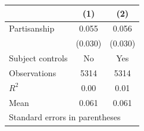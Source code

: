 \begin{tabular}{l*{2}{c}}
\hline\hline
                                   &\multicolumn{1}{c}{(1)}&\multicolumn{1}{c}{(2)}\\
\hline
Partisanship \hspace{28mm}         &    0.055&    0.056\\
                                   &  (0.030)&  (0.030)\\
Subject controls                   &       No&      Yes\\
\hline
Observations                       &     5314&     5314\\
\(R^{2}\)                          &     0.00&     0.01\\
Mean                               &    0.061&    0.061\\
\hline\hline
\multicolumn{3}{l}{\footnotesize Standard errors in parentheses}\\
\end{tabular}
